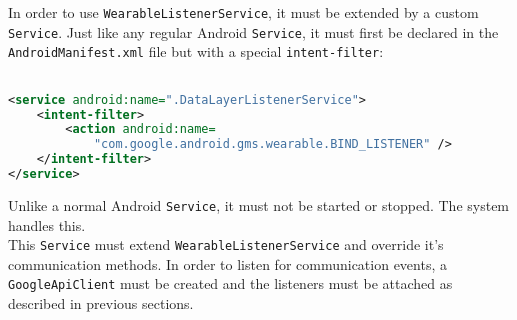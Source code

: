 In order to use \texttt{WearableListenerService}, it must be extended by a
custom \texttt{Service}. Just like any regular Android \texttt{Service}, it must
first be declared in the \texttt{AndroidManifest.xml} file but with a special
\texttt{intent-filter}:

\begin{lstlisting}[language=XML]

<service android:name=".DataLayerListenerService">
    <intent-filter>
        <action android:name=
            "com.google.android.gms.wearable.BIND_LISTENER" />
    </intent-filter>
</service>

\end{lstlisting}

Unlike a normal Android \texttt{Service}, it must not be started or stopped.
The system handles this.\\
This \texttt{Service} must extend \texttt{WearableListenerService} and
override it's communication methods. In order to listen for communication
events, a \texttt{GoogleApiClient} must be created and the listeners must be
attached as described in previous sections.

